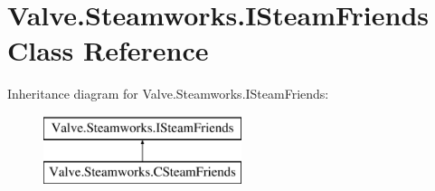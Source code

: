 \hypertarget{classValve_1_1Steamworks_1_1ISteamFriends}{}\section{Valve.\+Steamworks.\+I\+Steam\+Friends Class Reference}
\label{classValve_1_1Steamworks_1_1ISteamFriends}
Inheritance diagram for Valve.\+Steamworks.\+I\+Steam\+Friends\+:\begin{figure}[H]
\begin{center}
\leavevmode
\includegraphics[height=2.000000cm]{classValve_1_1Steamworks_1_1ISteamFriends}
\end{center}
\end{figure}
